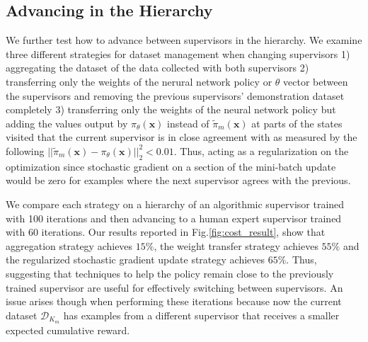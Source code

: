 \documentclass[10pt, conference]{ieeeconf}      %
\newcommand{\bx}{\mathbf{x}}
\begin{document}
\subsection{Advancing in the Hierarchy}
We further test how to advance between supervisors in the hierarchy. We examine three different strategies for dataset
management when changing supervisors 1) aggregating the dataset of the data collected with both supervisors 2)
transferring only the weights of the nerural network policy or $\theta$ vector between the supervisors and removing the
previous supervisors' demonstration dataset completely 3) transferring only the weights of the neural network policy but
adding the values output by $\pi_\theta(\bx)$  instead of $\tilde{\pi}_m(\bx)$ at parts of the states visited that the
current supervisor is in close agreement with as measured by the following $||\tilde{\pi}_m(\bx) - \pi_\theta(\bx)||^2_2
< 0.01$. Thus, acting as a regularization on the optimization since stochastic gradient on a section of the mini-batch update would be zero for examples where the next supervisor agrees with the previous. 

We compare each strategy on a hierarchy of an algorithmic supervisor trained with 100 iterations and then advancing to a human expert supervisor trained with 60 iterations.  Our results reported in Fig.\ref{fig:cost_result}, show that aggregation strategy achieves $15\%$, the weight transfer strategy achieves $55\%$ and the regularized stochastic gradient update strategy achieves $65\%$. Thus, suggesting that techniques to help the policy remain close to the previously trained supervisor are useful for effectively switching between supervisors.   
An issue arises though when performing these iterations because now the current dataset $\mathcal{D}_{K_m}$ has examples from a different supervisor that receives a smaller expected cumulative reward. 

\end{document}
